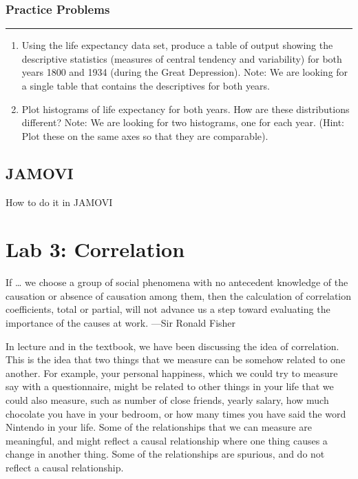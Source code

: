 \documentclass[]{book}
\begin{document}
\subsection{Practice Problems}\label{practice-problems-1}

\begin{center}\rule{0.5\linewidth}{0.5pt}\end{center}

\begin{enumerate}
\def\labelenumi{\arabic{enumi}.}
\item
  Using the life expectancy data set, produce a table of output showing
  the descriptive statistics (measures of central tendency and
  variability) for both years 1800 and 1934 (during the Great
  Depression). Note: We are looking for a single table that contains the
  descriptives for both years.
\item
  Plot histograms of life expectancy for both years. How are these
  distributions different? Note: We are looking for two histograms, one
  for each year. (Hint: Plot these on the same axes so that they are
  comparable).
\end{enumerate}

\section{JAMOVI}\label{jamovi-2}

How to do it in JAMOVI

\chapter{Lab 3: Correlation}\label{lab-3-correlation}

{ If \ldots{} we choose a group of social phenomena with no antecedent
knowledge of the causation or absence of causation among them, then the
calculation of correlation coefficients, total or partial, will not
advance us a step toward evaluating the importance of the causes at
work. ---Sir Ronald Fisher }

In lecture and in the textbook, we have been discussing the idea of
correlation. This is the idea that two things that we measure can be
somehow related to one another. For example, your personal happiness,
which we could try to measure say with a questionnaire, might be related
to other things in your life that we could also measure, such as number
of close friends, yearly salary, how much chocolate you have in your
bedroom, or how many times you have said the word Nintendo in your life.
Some of the relationships that we can measure are meaningful, and might
reflect a causal relationship where one thing causes a change in another
thing. Some of the relationships are spurious, and do not reflect a
causal relationship.
\end{document}
